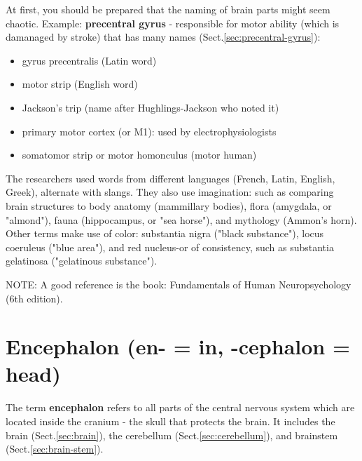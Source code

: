 At first, you should be prepared that the naming of brain parts might seem
chaotic. Example: {\bf precentral gyrus} - responsible for motor ability
(which is damanaged by stroke) that has many names
(Sect.\ref{sec:precentral-gyrus}):
\begin{itemize}
  \item gyrus precentralis (Latin word)
  \item motor strip (English word) 
  \item Jackson's trip (name after   Hughlings-Jackson who noted it)
  \item primary motor cortex (or M1): used by electrophysiologists
  
  \item somatomor strip or motor homonculus (motor human)
\end{itemize}
The researchers used words from different languages (French, Latin, English,
Greek), alternate with slangs. They also use imagination:
such as comparing brain structures to body anatomy (mammillary bodies), flora
(amygdala, or "almond"), fauna (hippocampus, or "sea horse"), and mythology
(Ammon's horn). Other terms make use of color: substantia nigra ("black
substance"), locus coeruleus ("blue area"), and red nucleus-or of consistency,
such as substantia gelatinosa ("gelatinous substance").

NOTE: A good reference is the book: Fundamentals of Human Neuropsychology (6th
edition).


\section{Encephalon (en- = in, -cephalon = head)}
\label{sec:encephalon}	

The term {\bf encephalon} refers to all parts of the central nervous system
which are located inside the cranium - the skull that protects the brain. 
It includes the brain (Sect.\ref{sec:brain}), the cerebellum
(Sect.\ref{sec:cerebellum}), and brainstem (Sect.\ref{sec:brain-stem}).

